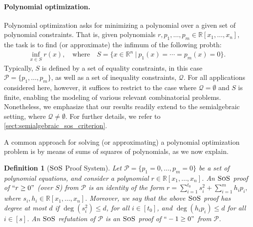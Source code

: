 \documentclass[11pt]{article}
\newcommand{\sos}{\text{\sc{SoS}}}
\newcommand{\1}{\textbf{1}}
\newtheorem{definition}[theorem]{Definition}
\begin{document}
\paragraph{Polynomial optimization.}
Polynomial optimization asks for minimizing a polynomial over a given set of polynomial constraints. That is, given polynomials $r, p_1, \ldots, p_m \in \mathbb{R}[x_1, \ldots, x_n]$, the task is to find (or approximate) the infimum of the following probth:
\begin{align}\label{eqn:POP_formulation}
    \inf_{x\in S} r(x), \quad {\text{where}} \quad S=\{x\in \mathbb{R}^n \ | \ p_1(x)=\cdots=p_m(x)=0\}.
\end{align}
%
Typically, \( S \) is defined by a set of equality constraints, in this case \( \mathcal{P} = \{p_1, \ldots, p_m\}\), as well as a set of inequality constraints, \( \mathcal{Q} \). For all applications considered here, however, it suffices to restrict to the case where \( \mathcal{Q} = \emptyset \) and \( S \) is finite, enabling the modeling of various relevant combinatorial problems. Nonetheless, we emphasize that our results readily extend to the semialgebraic setting, where \( \mathcal{Q} \neq \emptyset \). For further details, we refer to \cref{sect:semialgebraic_sos_criterion}.

A common approach for solving (or approximating) a polynomial optimization problem is by means of sums of squares of polynomials, as we now explain.
\begin{definition}[$\sos$ Proof System]\label{def:SOS_proof}
    Let $\mathcal{P} = \{p_1=0,\ldots,p_m=0\}$ be a set of polynomial equations, and consider a polynomial $r\in \mathbb{R}[x_1, \dots, x_n]$. An $\sos$ proof of $``r\geq 0"$ (over $S$) from $\mathcal{P}$ is an identity of the form $r = \sum_{i=1}^{t_0} s_i^2 + \sum_{i=1}^m h_i p_i,$
    where $s_i, h_i\in \mathbb{R}[x_1, \ldots, x_n]$. Moreover, we say that the above $\sos$ proof %
    has \emph{degree} at most $d$ if $\deg(s_i^2) \leq d$, for all $i \in [t_0]$, and $\deg(h_i p _i) \leq d$ for all $i \in [s]$. An \emph{$\sos$ refutation of $\mathcal{P}$} is an $\sos$ proof of $``-1 \geq 0"$ from $\mathcal{P}$.
\end{definition}
\end{document}
